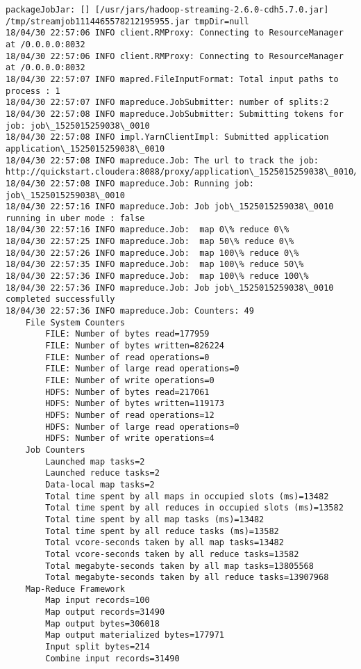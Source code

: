\documentclass[11pt]{article}
\begin{document}
    \begin{Verbatim}[commandchars=\\\{\}]
packageJobJar: [] [/usr/jars/hadoop-streaming-2.6.0-cdh5.7.0.jar] /tmp/streamjob1114465578212195955.jar tmpDir=null
18/04/30 22:57:06 INFO client.RMProxy: Connecting to ResourceManager at /0.0.0.0:8032
18/04/30 22:57:06 INFO client.RMProxy: Connecting to ResourceManager at /0.0.0.0:8032
18/04/30 22:57:07 INFO mapred.FileInputFormat: Total input paths to process : 1
18/04/30 22:57:07 INFO mapreduce.JobSubmitter: number of splits:2
18/04/30 22:57:08 INFO mapreduce.JobSubmitter: Submitting tokens for job: job\_1525015259038\_0010
18/04/30 22:57:08 INFO impl.YarnClientImpl: Submitted application application\_1525015259038\_0010
18/04/30 22:57:08 INFO mapreduce.Job: The url to track the job: http://quickstart.cloudera:8088/proxy/application\_1525015259038\_0010/
18/04/30 22:57:08 INFO mapreduce.Job: Running job: job\_1525015259038\_0010
18/04/30 22:57:16 INFO mapreduce.Job: Job job\_1525015259038\_0010 running in uber mode : false
18/04/30 22:57:16 INFO mapreduce.Job:  map 0\% reduce 0\%
18/04/30 22:57:25 INFO mapreduce.Job:  map 50\% reduce 0\%
18/04/30 22:57:26 INFO mapreduce.Job:  map 100\% reduce 0\%
18/04/30 22:57:35 INFO mapreduce.Job:  map 100\% reduce 50\%
18/04/30 22:57:36 INFO mapreduce.Job:  map 100\% reduce 100\%
18/04/30 22:57:36 INFO mapreduce.Job: Job job\_1525015259038\_0010 completed successfully
18/04/30 22:57:36 INFO mapreduce.Job: Counters: 49
	File System Counters
		FILE: Number of bytes read=177959
		FILE: Number of bytes written=826224
		FILE: Number of read operations=0
		FILE: Number of large read operations=0
		FILE: Number of write operations=0
		HDFS: Number of bytes read=217061
		HDFS: Number of bytes written=119173
		HDFS: Number of read operations=12
		HDFS: Number of large read operations=0
		HDFS: Number of write operations=4
	Job Counters 
		Launched map tasks=2
		Launched reduce tasks=2
		Data-local map tasks=2
		Total time spent by all maps in occupied slots (ms)=13482
		Total time spent by all reduces in occupied slots (ms)=13582
		Total time spent by all map tasks (ms)=13482
		Total time spent by all reduce tasks (ms)=13582
		Total vcore-seconds taken by all map tasks=13482
		Total vcore-seconds taken by all reduce tasks=13582
		Total megabyte-seconds taken by all map tasks=13805568
		Total megabyte-seconds taken by all reduce tasks=13907968
	Map-Reduce Framework
		Map input records=100
		Map output records=31490
		Map output bytes=306018
		Map output materialized bytes=177971
		Input split bytes=214
		Combine input records=31490

\end{Verbatim}
\end{document}
